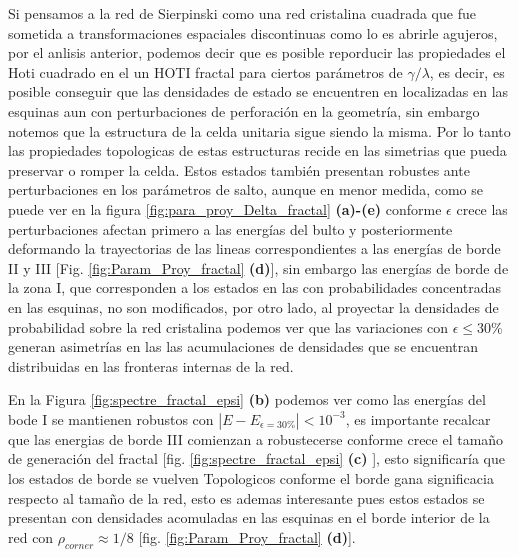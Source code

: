 Si pensamos a la red de Sierpinski como una red cristalina cuadrada que fue sometida a transformaciones espaciales discontinuas como lo es abrirle agujeros, por el anlisis anterior, podemos decir que es posible reporducir las propiedades el Hoti cuadrado en el un HOTI fractal para ciertos parámetros de $\gamma/\lambda$, es decir, es posible conseguir que las densidades de estado se encuentren en localizadas en las esquinas aun con perturbaciones de perforación en la geometría, sin embargo notemos que la estructura de la celda unitaria sigue siendo la misma. Por lo tanto las propiedades topologicas de estas estructuras recide en las simetrias que pueda preservar o romper la celda. 
Estos estados también presentan robustes ante perturbaciones en los parámetros de salto, aunque en menor medida, como se puede ver en la figura \ref{fig:para_proy_Delta_fractal} \textbf{(a)-(e)} conforme $\epsilon$ crece las perturbaciones afectan primero a las energías del bulto y posteriormente deformando la trayectorias de las lineas correspondientes a las energías de borde II y III [Fig. \ref{fig:Param_Proy_fractal} \textbf{(d)}], sin embargo las energías de borde de la zona I,  que corresponden a los estados en las con probabilidades concentradas en las esquinas, no son modificados, por otro lado, al proyectar la densidades de probabilidad sobre la red cristalina podemos ver que las variaciones con $\epsilon \leq 30\%$ generan asimetrías en las las acumulaciones de densidades que se encuentran distribuidas en las fronteras internas de la red.

En la Figura \ref{fig:spectre_fractal_epsi} \textbf{(b)} podemos ver como las energías del bode I  se mantienen robustos con $|E - E_{\epsilon = 30\%}| < 10^{-3}$, es importante recalcar que las energias de borde III comienzan a robustecerse conforme crece el tamaño de generación del fractal [fig. \ref{fig:spectre_fractal_epsi} \textbf{(c)} ], esto significaría que los estados de borde se vuelven Topologicos conforme el borde gana significacia respecto al tamaño de la red, esto es ademas interesante pues estos estados se presentan con densidades acomuladas en las esquinas en el borde interior de la red con $\rho_{corner} \approx 1/8$ [fig. \ref{fig:Param_Proy_fractal} \textbf{(d)}]. 






